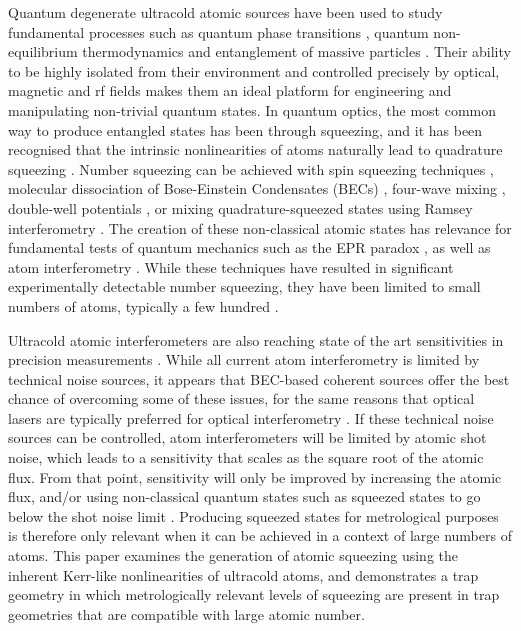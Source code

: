 \documentclass{iopart}
\begin{document}
Quantum degenerate ultracold atomic sources have been used to study fundamental processes such as quantum phase transitions \cite{Leggett2001,Buluta2009}, quantum non-equilibrium thermodynamics \cite{Kinoshita:2006,Barnett:2011} and entanglement of massive particles \cite{Kheruntsyan:2005}.  Their ability to be highly isolated from their environment and controlled precisely by optical, magnetic and rf fields makes them an ideal platform for engineering and manipulating non-trivial quantum states. In quantum optics, the most common way to produce entangled states has been through squeezing, and it has been recognised that the intrinsic nonlinearities of atoms naturally lead to quadrature squeezing \cite{Kheruntsyan:2005, johnssonET2007, haineET2009, doeringET2010}.  Number squeezing can be achieved with spin squeezing techniques \cite{kitagawaET1993, gross2010, sinatra2012}, molecular dissociation of Bose-Einstein Condensates (BECs) \cite{kheruntsyanET2002,davisET2008,savage2007,ogren2010}, four-wave mixing \cite{perrin2008, ogren2009, jascula2010}, double-well potentials \cite{esteve2008, maussang2010}, or mixing quadrature-squeezed states using Ramsey interferometry \cite{haineET2009}. The creation of these non-classical atomic states has relevance for fundamental tests of quantum mechanics such as the EPR paradox \cite{ogren2010, pu2000, sorensen2001, haine2005,zhao2007}, as well as atom interferometry \cite{doeringET2010, gross2010, sorensenET1999, kuzmichET2000, meyerET2001, liebfriedET2004, roosET2006}.
While these techniques have resulted in significant experimentally detectable number squeezing, they have been limited to small numbers of atoms, typically a few hundred \cite{gross2010, esteve2008}. 

Ultracold atomic interferometers are also reaching state of the art sensitivities in precision measurements \cite{robins:2013, altinET2013}. While all current atom interferometry is limited by technical noise sources, it appears that BEC-based coherent sources offer the best chance of overcoming some of these issues, for the same reasons that optical lasers are typically preferred for optical interferometry \cite{szigeti:2012}. If these technical noise sources can be controlled, atom interferometers will be limited by atomic shot noise, which leads to a sensitivity that scales as the square root of the atomic flux.   From that point, sensitivity will only be improved by increasing the atomic flux, and/or using non-classical quantum states such as squeezed states to go below the shot noise limit \cite{robins:2013}.  Producing squeezed states for metrological purposes is therefore only relevant when it can be achieved in a context of large numbers of atoms.  This paper examines the generation of atomic squeezing using the inherent Kerr-like nonlinearities of ultracold atoms, and demonstrates a trap geometry in which metrologically relevant levels of squeezing are present in trap geometries that are compatible with large atomic number.
\end{document}
